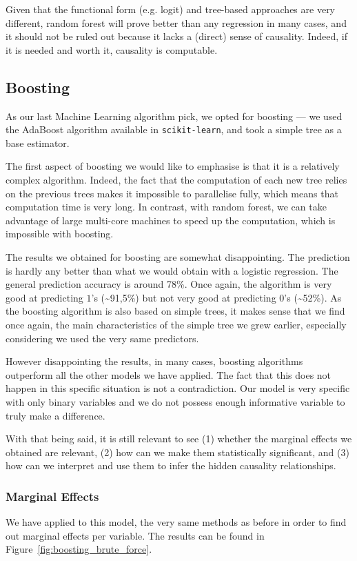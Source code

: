 Given that the functional form (e.g. logit) and tree-based approaches are very different, random forest will prove better than any regression in many cases, and it should not be ruled out because it lacks a (direct) sense of causality. Indeed, if it is needed and worth it, causality is computable.


\subsection{Boosting}
As our last Machine Learning algorithm pick, we opted for boosting --- we used the AdaBoost algorithm available in \texttt{scikit-learn}, and took a simple tree as a base estimator.

The first aspect of boosting we would like to emphasise is that it is a relatively complex algorithm. Indeed, the fact that the computation of each new tree relies on the previous trees makes it impossible to parallelise fully, which means that computation time is very long. In contrast, with random forest, we can take advantage of large multi-core machines to speed up the computation, which is impossible with boosting.

The results we obtained for boosting are somewhat disappointing. The prediction is hardly any better than what we would obtain with a logistic regression. The general prediction accuracy is around 78\%. Once again, the algorithm is very good at predicting $1$’s (\textasciitilde91,5\%) but not very good at predicting $0$’s (\textasciitilde52\%). As the boosting algorithm is also based on simple trees, it makes sense that we find once again, the main characteristics of the simple tree we grew earlier, especially considering we used the very same predictors.

However disappointing the results, in many cases, boosting algorithms outperform all the other models we have applied. The fact that this does not happen in this specific situation is not a contradiction. Our model is very specific with only binary variables and we do not possess enough informative variable to truly make a difference.

With that being said, it is still relevant to see (1) whether the marginal effects we obtained are relevant, (2) how can we make them statistically significant, and (3) how can we interpret and use them to infer the hidden causality relationships.

\subsubsection{Marginal Effects}
We have applied to this model, the very same methods as before in order to find out marginal effects per variable. The results can be found in Figure~\ref{fig:boosting_brute_force}.

